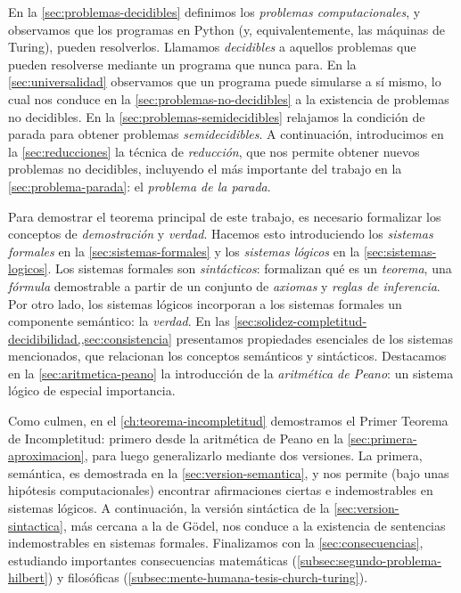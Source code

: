 En la \cref{sec:problemas-decidibles} definimos los \emph{problemas computacionales}, y observamos que los programas en Python (y, equivalentemente, las máquinas de Turing), pueden resolverlos. Llamamos \emph{decidibles} a aquellos problemas que pueden resolverse mediante un programa que nunca para. En la \cref{sec:universalidad} observamos que un programa puede simularse a sí mismo, lo cual nos conduce en la \cref{sec:problemas-no-decidibles} a la existencia de problemas no decidibles. En la \cref{sec:problemas-semidecidibles} relajamos la condición de parada para obtener problemas \emph{semidecidibles}. A continuación, introducimos en la \cref{sec:reducciones} la técnica de \emph{reducción}, que nos permite obtener nuevos problemas no decidibles, incluyendo el más importante del trabajo en la \cref{sec:problema-parada}: el \emph{problema de la parada}.

Para demostrar el teorema principal de este trabajo, es necesario formalizar los conceptos de \emph{demostración} y \emph{verdad}. Hacemos esto introduciendo los \emph{sistemas formales} en la \cref{sec:sistemas-formales} y los \emph{sistemas lógicos} en la \cref{sec:sistemas-logicos}. Los sistemas formales son \emph{sintácticos}: formalizan qué es un \emph{teorema}, una \emph{fórmula} demostrable a partir de un conjunto de \emph{axiomas} y \emph{reglas de inferencia}. Por otro lado, los sistemas lógicos incorporan a los sistemas formales un componente semántico: la \emph{verdad}. En las \cref{sec:solidez-completitud-decidibilidad,,sec:consistencia} presentamos propiedades esenciales de los sistemas mencionados, que relacionan los conceptos semánticos y sintácticos. Destacamos en la \cref{sec:aritmetica-peano} la introducción de la \emph{aritmética de Peano}: un sistema lógico de especial importancia.

Como culmen, en el \cref{ch:teorema-incompletitud} demostramos el Primer Teorema de Incompletitud: primero desde la aritmética de Peano en la \cref{sec:primera-aproximacion}, para luego generalizarlo mediante dos versiones. La primera, semántica, es demostrada en la \cref{sec:version-semantica}, y nos permite (bajo unas hipótesis computacionales) encontrar afirmaciones ciertas e indemostrables en sistemas lógicos. A continuación, la versión sintáctica de la \cref{sec:version-sintactica}, más cercana a la de Gödel, nos conduce a la existencia de sentencias indemostrables en sistemas formales. Finalizamos con la \cref{sec:consecuencias}, estudiando importantes consecuencias matemáticas (\cref{subsec:segundo-problema-hilbert}) y filosóficas (\cref{subsec:mente-humana-tesis-church-turing}).

